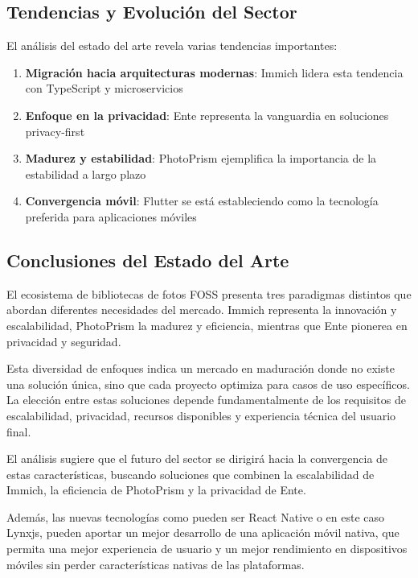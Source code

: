 \subsection{Tendencias y Evolución del Sector}

El análisis del estado del arte revela varias tendencias importantes:

\begin{enumerate}
    \item \textbf{Migración hacia arquitecturas modernas}: Immich lidera esta tendencia con TypeScript y microservicios
    \item \textbf{Enfoque en la privacidad}: Ente representa la vanguardia en soluciones privacy-first
    \item \textbf{Madurez y estabilidad}: PhotoPrism ejemplifica la importancia de la estabilidad a largo plazo
    \item \textbf{Convergencia móvil}: Flutter se está estableciendo como la tecnología preferida para aplicaciones móviles
\end{enumerate}

\subsection{Conclusiones del Estado del Arte}

El ecosistema de bibliotecas de fotos FOSS presenta tres paradigmas distintos que abordan diferentes necesidades del mercado. Immich representa la innovación y escalabilidad, PhotoPrism la madurez y eficiencia, mientras que Ente pionerea en privacidad y seguridad.

Esta diversidad de enfoques indica un mercado en maduración donde no existe una solución única, sino que cada proyecto optimiza para casos de uso específicos. La elección entre estas soluciones depende fundamentalmente de los requisitos de escalabilidad, privacidad, recursos disponibles y experiencia técnica del usuario final.

El análisis sugiere que el futuro del sector se dirigirá hacia la convergencia de estas características, buscando soluciones que combinen la escalabilidad de Immich, la eficiencia de PhotoPrism y la privacidad de Ente.

Además, las nuevas tecnologías como pueden ser React Native o en este caso Lynxjs, pueden aportar un mejor desarrollo de una aplicación móvil nativa, que permita una mejor experiencia de usuario y un mejor rendimiento en dispositivos móviles sin perder características nativas de las plataformas.

